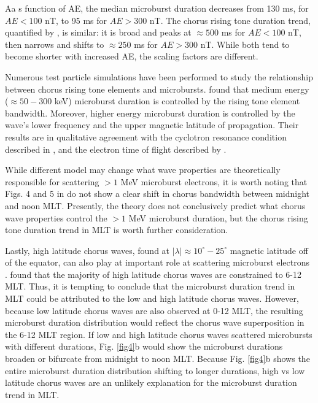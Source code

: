 \documentclass[draft]{agujournal2019}
\begin{document}
Aa s function of AE, the median microburst duration decreases from 130 ms, for $AE < 100$ nT, to 95 ms for $AE > 300$ nT. The chorus rising tone duration trend, quantified by , is similar: it is broad and peaks at $\approx 500$ ms for $AE < 100$ nT, then narrows and shifts to $\approx 250$ ms for $AE > 300$ nT. While both tend to become shorter with increased AE, the scaling factors are different.

Numerous test particle simulations have been performed to study the relationship between chorus rising tone elements and microbursts.  found that medium energy ($\approx 50-300$ keV) microburst duration is controlled by the rising tone element bandwidth. Moreover, higher energy microburst duration is controlled by the wave's lower frequency and the upper magnetic latitude of propagation. Their results are in qualitative agreement with the cyclotron resonance condition described in , and the  electron time of flight described by .

While different model  may change what wave properties are theoretically responsible for scattering $>1$ MeV microburst electrons, it is worth noting that Figs. 4 and 5 in  do not show a clear shift in chorus bandwidth between midnight and noon MLT. Presently, the theory does not conclusively predict what chorus wave properties control the $> 1$ MeV microburst duration, but the chorus rising tone duration trend in MLT is worth further consideration.

Lastly, high latitude chorus waves, found at $|\lambda| \approx 10^\circ-25^\circ$ magnetic latitude off of the equator, can also play at important role at scattering microburst electrons \cite{Lorentzen2001a}.  found that the majority of high latitude chorus waves are constrained to 6-12 MLT. Thus, it is tempting to conclude that the microburst duration trend in MLT could be attributed to the low and high latitude chorus waves. However, because low latitude chorus waves are also observed at 0-12 MLT, the resulting microburst duration distribution would reflect the chorus wave superposition in the 6-12 MLT region. If low and high latitude chorus waves scattered microbursts with different durations, Fig. \ref{fig4}b would show the microburst durations broaden or bifurcate from midnight to noon MLT. Because Fig. \ref{fig4}b shows the entire microburst duration distribution shifting to longer durations, high vs low latitude chorus waves are an unlikely explanation for the microburst duration trend in MLT.
\end{document}
